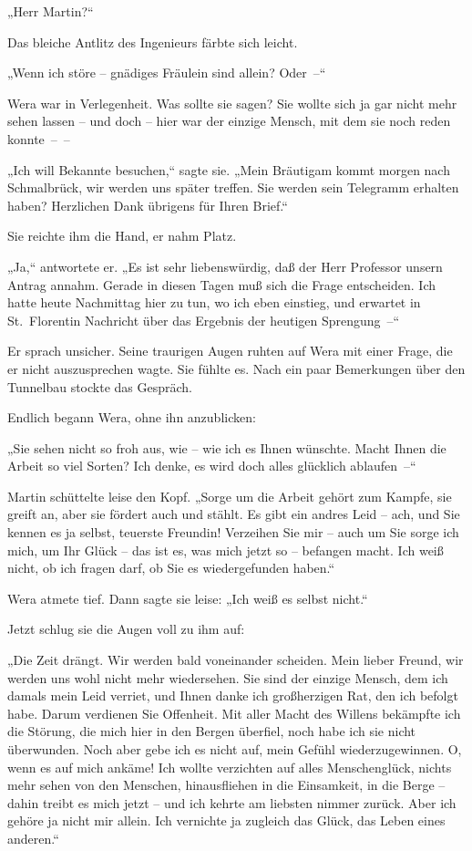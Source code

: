„Herr Martin?“

Das bleiche Antlitz des Ingenieurs färbte sich leicht.

„Wenn ich störe – gnädiges Fräulein sind allein? Oder~–“

Wera war in Verlegenheit. Was sollte sie sagen? Sie wollte sich ja
gar nicht mehr sehen lassen – und doch – hier war der einzige
Mensch, mit dem sie noch reden konnte~–~–

„Ich will Bekannte besuchen,“ sagte sie. „Mein Bräutigam kommt
morgen nach Schmalbrück, wir werden uns später treffen. Sie werden
sein Telegramm erhalten haben? Herzlichen Dank übrigens für Ihren
Brief.“

Sie reichte ihm die Hand, er nahm Platz.

„Ja,“ antwortete er. „Es ist sehr liebenswürdig, daß der Herr
Professor unsern Antrag annahm. Gerade in diesen Tagen muß sich die
Frage entscheiden. Ich hatte heute Nachmittag hier zu tun, wo ich
eben einstieg, und erwartet in St.~Florentin Nachricht über das
Ergebnis der heutigen Sprengung~–“

Er sprach unsicher. Seine traurigen Augen ruhten auf Wera mit einer
Frage, die er nicht auszusprechen wagte. Sie fühlte es. Nach ein
paar Bemerkungen über den Tunnelbau stockte das Gespräch.

Endlich begann Wera, ohne ihn anzublicken:

„Sie sehen nicht so froh aus, wie – wie ich es Ihnen wünschte.
Macht Ihnen die Arbeit so viel Sorten? Ich denke, es wird doch
alles glücklich ablaufen~–“

Martin schüttelte leise den Kopf. „Sorge um die Arbeit gehört zum
Kampfe, sie greift an, aber sie fördert auch und stählt. Es gibt
ein andres Leid – ach, und Sie kennen es ja selbst, teuerste
Freundin! Verzeihen Sie mir – auch um Sie sorge ich mich, um Ihr
Glück – das ist es, was mich jetzt so – befangen macht. Ich weiß
nicht, ob ich fragen darf, ob Sie es wiedergefunden haben.“

Wera atmete tief. Dann sagte sie leise: „Ich weiß es selbst
nicht.“

Jetzt schlug sie die Augen voll zu ihm auf:

„Die Zeit drängt. Wir werden bald voneinander scheiden. Mein lieber
Freund, wir werden uns wohl nicht mehr wiedersehen. Sie sind der
einzige Mensch, dem ich damals mein Leid verriet, und Ihnen danke
ich großherzigen Rat, den ich befolgt habe. Darum verdienen Sie
Offenheit. Mit aller Macht des Willens bekämpfte ich die Störung,
die mich hier in den Bergen überfiel, noch habe ich sie nicht
überwunden. Noch aber gebe ich es nicht auf, mein Gefühl
wiederzugewinnen. O, wenn es auf mich ankäme! Ich wollte verzichten
auf alles Menschenglück, nichts mehr sehen von den Menschen,
hinausfliehen in die Einsamkeit, in die Berge – dahin treibt es
mich jetzt – und ich kehrte am liebsten nimmer zurück. Aber ich
gehöre ja nicht mir allein. Ich vernichte ja zugleich das Glück,
das Leben eines anderen.“

